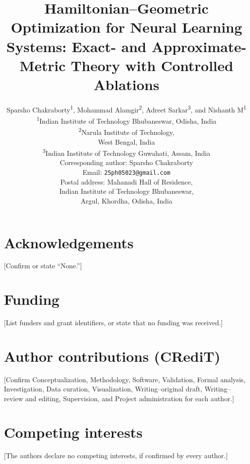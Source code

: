 \documentclass[11pt]{article}
\title{Hamiltonian--Geometric Optimization for Neural Learning Systems:
Exact- and Approximate-Metric Theory with Controlled Ablations}
\author{%
Sparsho Chakraborty\textsuperscript{1},
Mohammad Alamgir\textsuperscript{2},
Adreet Sarkar\textsuperscript{3}, and
Nishanth M\textsuperscript{1}\\[1em]
\small \textsuperscript{1}Indian Institute of Technology Bhubaneswar,
Odisha, India\\
\small \textsuperscript{2}Narula Institute of Technology,\\
\small West Bengal, India\\
\small \textsuperscript{3}Indian Institute of Technology Guwahati, Assam, India\\[1em]
\small Corresponding author: Sparsho Chakraborty\\
\small Email: \texttt{25ph05023@gmail.com}\\
\small Postal address: Mahanadi Hall of Residence,\\
\small Indian Institute of Technology Bhubaneswar,\\
\small Argul, Khordha, Odisha, India
}
\date{}
\begin{document}
\maketitle

\section*{Acknowledgements}
[Confirm or state ``None.'']

\section*{Funding}
[List funders and grant identifiers, or state that no funding was received.]

\section*{Author contributions (CRediT)}
[Confirm Conceptualization, Methodology, Software, Validation, Formal analysis,
Investigation, Data curation, Visualization, Writing--original draft,
Writing--review and editing, Supervision, and Project administration for each
author.]

\section*{Competing interests}
[The authors declare no competing interests, if confirmed by every author.]
\end{document}
